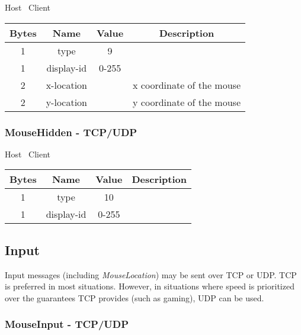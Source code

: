 \begin{center}
    Host \textrightarrow\ Client\\
    \begin{tabular}{|c|c|c|c|}
        \hline
        \textbf{Bytes} & \textbf{Name} & \textbf{Value} & \textbf{Description}      \\
        \hline
        1              & type          & 9              &                           \\
        \hline
        1              & display-id    & 0-255          &                           \\
        \hline
        2              & x-location    &                & x coordinate of the mouse \\
        \hline
        2              & y-location    &                & y coordinate of the mouse \\
        \hline
    \end{tabular}
\end{center}

\subsubsection{MouseHidden - TCP/UDP}

\begin{center}
    Host \textrightarrow\ Client\\
    \begin{tabular}{|c|c|c|c|}
        \hline
        \textbf{Bytes} & \textbf{Name} & \textbf{Value} & \textbf{Description} \\
        \hline
        1              & type          & 10              &                      \\
        \hline
        1              & display-id    & 0-255          &                      \\
        \hline
    \end{tabular}
\end{center}

\subsection{Input}

Input messages (including \emph{MouseLocation}) may be sent over TCP or UDP. TCP is preferred in most situations.
However, in situations where speed is prioritized over the guarantees TCP provides (such as gaming), UDP can be
used.

\subsubsection{MouseInput - TCP/UDP}

